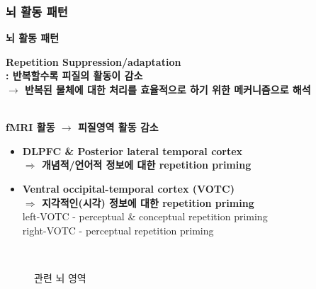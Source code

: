 \documentclass{beamer}
\begin{document}
\subsubsection{뇌 활동 패턴}
\begin{frame}{\textbf{뇌 활동 패턴}}
  \begin{itemize}
    \item \textbf{\color{blue} Repetition Suppression/adaptation\\: 반복할수록 피질의 활동이 감소}\\
      \textbf{$\rightarrow$ 반복된 물체에 대한 처리를 효율적으로 하기 위한 메커니즘으로 해석}\\~\\
        
    \begin{minipage}{0.85\textwidth}
    \item \textbf{fMRI 활동 $\longrightarrow$ 피질영역 활동 감소}\\
      \vspace{-1em}
      \begin{itemize}
        \item \textbf{DLPFC & Posterior lateral temporal cortex}\\
          \textbf{$\Rightarrow$ 개념적/언어적 정보에 대한 repetition priming}
        \item \textbf{Ventral occipital-temporal cortex (VOTC)}\\
          \textbf{$\Rightarrow$ 지각적인(시각) 정보에 대한 repetition priming}\\
          left-VOTC - perceptual \& conceptual repetition priming\\
          right-VOTC - perceptual repetition priming
      \end{itemize}
    \end{minipage}%
    \hspace{-16em}
    \begin{minipage}{0.4\textwidth}
      \begin{figure}
        \qquad
        \\
        \vspace{-1em}
        \vspace{-0.5em}
        \caption{관련 뇌 영역}
      \end{figure}
    \end{minipage}%


\end{itemize}
\end{frame}
\end{document}
